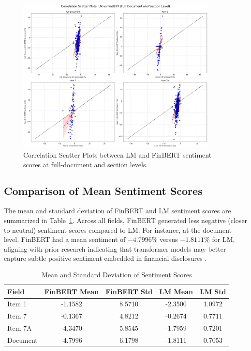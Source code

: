 \documentclass[12pt]{article}
\begin{document}
\begin{figure}[H]
\centering
\includegraphics[width=0.9\textwidth]{figures/correlation_scatter_full_and_sections.png}
\caption{Correlation Scatter Plots between LM and FinBERT sentiment scores at full-document and section levels.}
\label{fig:scatter_all}
\end{figure}
\vspace{0.5cm}

\subsection{Comparison of Mean Sentiment Scores}

The mean and standard deviation of FinBERT and LM sentiment scores are summarized in Table~\ref{tab:mean_std_results}. Across all fields, FinBERT generated less negative (closer to neutral) sentiment scores compared to LM. For instance, at the document level, FinBERT had a mean sentiment of $-4.7996\%$ versus $-1.8111\%$ for LM, aligning with prior research indicating that transformer models may better capture subtle positive sentiment embedded in financial disclosures \citep{Huang2020}.

\begin{table}[H]
\centering
\caption{Mean and Standard Deviation of Sentiment Scores}
\label{tab:mean_std_results}
\begin{tabular}{lcccc}
\hline
Field & FinBERT Mean & FinBERT Std & LM Mean & LM Std \\
\hline
Item 1 & -1.1582 & 8.5710 & -2.3500 & 1.0972 \\
Item 7 & -0.1367 & 4.8212 & -0.2674 & 0.7711 \\
Item 7A & -4.3470 & 5.8545 & -1.7959 & 0.7201 \\
Document & -4.7996 & 6.1798 & -1.8111 & 0.7053 \\
\hline
\end{tabular}
\end{table}
\vspace{0.5cm}
\end{document}
